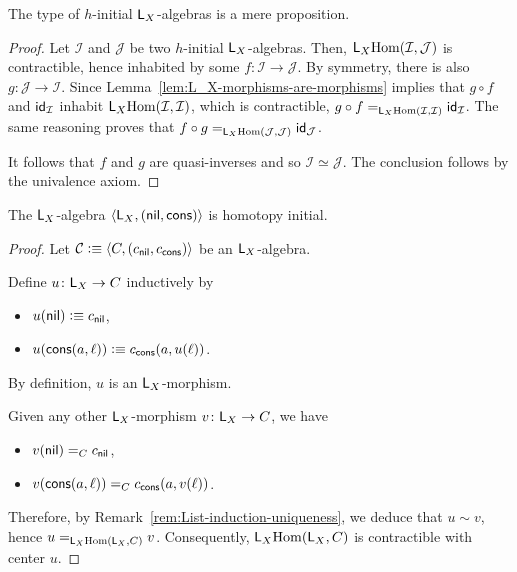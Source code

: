 \begin{thm}
    The type of\/ $h$-initial\/ $\mathsf{L}_X$-algebras is a mere proposition.
\end{thm}

\begin{proof}
    Let $\mathcal I$ and $\mathcal J$ be two $h$-initial $\mathsf{L}_X$-algebras. Then, $\mathsf{L}_X{\operatorname{Hom}}(\mathcal I,\mathcal J)$ is contractible, hence inhabited by some $f\colon\mathcal I\to\mathcal J$. By symmetry, there is also $g\colon\mathcal J\to\mathcal I$. Since  Lemma~\ref{lem:L_X-morphisms-are-morphisms} implies that $g\circ f$ and $\mathsf{id}_{\mathcal I}$ inhabit $\mathsf{L}_X{\operatorname{Hom}}(\mathcal I,\mathcal I)$, which is contractible, $g\circ f\mathrel{=_{\mathsf{L}_X{\operatorname{Hom}}(\mathcal I,\mathcal I)}}\mathsf{id}_{\mathcal I}$. The same reasoning proves that $f\circ g\mathrel{=_{\mathsf{L}_X{\operatorname{Hom}}(\mathcal J,\mathcal J)}}\mathsf{id}_{\mathcal J}$.

    It follows that $f$ and $g$ are quasi-inverses and so $\mathcal I\simeq\mathcal J$. The conclusion follows by the univalence axiom.
\end{proof}

\begin{thm}
    The\/ $\mathsf{L}_X$-algebra\/ $\langle\mathsf{L}_X,(\mathsf{nil},\mathsf{cons})\rangle$ is homotopy initial.
\end{thm}

\begin{proof}
    Let $\mathcal C\mathrel{\vcentcolon}\equiv\langle C,(c_{\mathsf{nil}},c_{\mathsf{cons}})\rangle$ be an $\mathsf{L}_X$-algebra.

    Define $u\colon\fun L_X\to C$ inductively by
    \begin{itemize}
        \item $u(\mathsf{nil})\mathrel{\vcentcolon}\equiv c_{\mathsf{nil}}$,
        \item $u(\mathsf{cons}(a,\ell))\mathrel{\vcentcolon}\equiv c_{\mathsf{cons}}(a,u(\ell))$.
    \end{itemize}
    By definition, $u$ is an $\mathsf{L}_X$-morphism.

    Given any other $\mathsf{L}_X$-morphism $v\colon\fun L_X\to C$, we have
    \begin{itemize}
        \item $v(\mathsf{nil})\mathrel{=_{C}} c_{\mathsf{nil}}$,
        \item $v(\mathsf{cons}(a,\ell))\mathrel{=_{C}} c_{\mathsf{cons}}(a,v(\ell))$.
    \end{itemize}
    Therefore, by Remark~\ref{rem:List-induction-uniqueness}, we deduce that $u\sim v$, hence $u\mathrel{=_{\mathsf{L}_X{\operatorname{Hom}}(\mathsf{L}_X,C)}}v$. Consequently, $\mathsf{L}_X{\operatorname{Hom}}(\mathsf{L}_X,C)$ is contractible with center $u$.
    
\end{proof}

